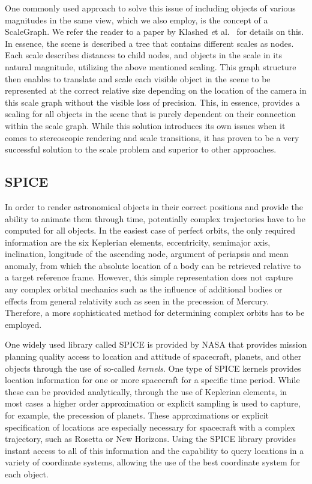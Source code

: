 \documentclass{vgtc}                %
\begin{document}
One commonly used approach to solve this issue of including objects of various magnitudes in the same view, which we also employ, is the concept of a ScaleGraph. We refer the reader to a paper by Klashed \emph et al.~\cite{Uniview} for details on this. In essence, the scene is described a tree that contains different scales as nodes. Each scale describes distances to child nodes, and objects in the scale in its natural magnitude, utilizing the above mentioned scaling. This graph structure then enables to translate and scale each visible object in the scene to be represented at the correct relative size depending on the location of the camera in this scale graph without the visible loss of precision. This, in essence, provides a scaling for all objects in the scene that is purely dependent on their connection within the scale graph. While this solution introduces its own issues when it comes to stereoscopic rendering and scale transitions, it has proven to be a very successful solution to the scale problem and superior to other approaches.

\subsection*{SPICE}
In order to render astronomical objects in their correct positions and provide the ability to animate them through time, potentially complex trajectories have to be computed for all objects. In the easiest case of perfect orbits, the only required information are the six Keplerian elements, eccentricity, semimajor axis, inclination, longitude of the ascending node, argument of periapsis and mean anomaly, from which the absolute location of a body can be retrieved relative to a target reference frame. However, this simple representation does not capture any complex orbital mechanics such as the influence of additional bodies or effects from general relativity such as seen in the precession of Mercury. Therefore, a more sophisticated method for determining complex orbits has to be employed.

One widely used library called SPICE is provided by NASA that provides mission planning quality access to location and attitude of spacecraft, planets, and other objects through the use of so-called \emph{kernels}. One type of SPICE kernels provides location information for one or more spacecraft for a specific time period. While these can be provided analytically, through the use of Keplerian elements, in most cases a higher order approximation or explicit sampling is used to capture, for example, the precession of planets. These approximations or explicit specification of locations are especially necessary for spacecraft with a complex trajectory, such as Rosetta or New Horizons. Using the SPICE library provides instant access to all of this information and the capability to query locations in a variety of coordinate systems, allowing the use of the best coordinate system for each object.
\end{document}
